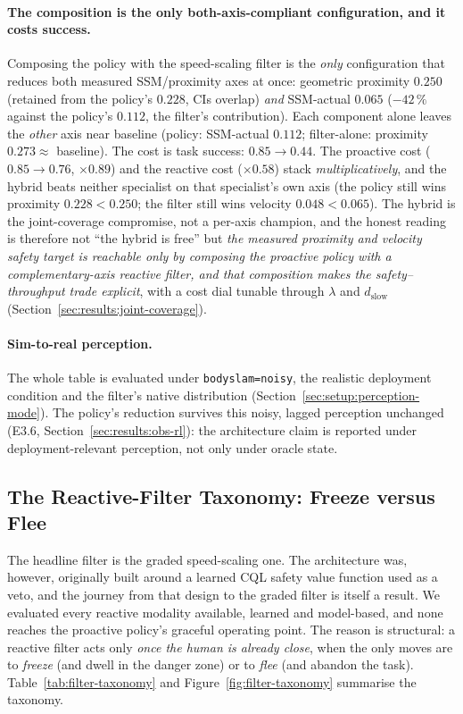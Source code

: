 \documentclass[11pt,a4paper]{report}
\newcommand{\ssm}{SSM}
\begin{document}
\paragraph{The composition is the only both-axis-compliant
configuration, and it costs success.}
Composing the policy with the speed-scaling filter is the \emph{only}
configuration that reduces both measured \ssm{}/proximity axes at once:
geometric
proximity $0.250$ (retained from the policy's $0.228$, CIs overlap)
\emph{and} \ssm{}-actual $0.065$ ($-42\,\%$ against the policy's
$0.112$, the filter's contribution). Each component alone leaves the
\emph{other} axis near baseline (policy: \ssm{}-actual $0.112$;
filter-alone: proximity $0.273 \approx$ baseline). The cost is task
success: $0.85 \rightarrow 0.44$. The proactive cost ($0.85 \to 0.76$,
$\times 0.89$) and the reactive cost ($\times 0.58$) stack
\emph{multiplicatively}, and the hybrid beats neither specialist on
that specialist's own axis (the policy still wins proximity
$0.228 < 0.250$; the filter still wins velocity $0.048 < 0.065$). The
hybrid is the joint-coverage compromise, not a per-axis champion, and
the honest reading is therefore not ``the hybrid is free'' but
\emph{the measured proximity and velocity safety target is reachable
only by composing the proactive policy with a complementary-axis
reactive filter, and that composition makes the safety--throughput
trade explicit}, with a cost dial tunable through
$\lambda$ and $d_{\mathrm{slow}}$
(Section~\ref{sec:results:joint-coverage}).

\paragraph{Sim-to-real perception.}
The whole table is evaluated under \texttt{bodyslam=noisy}, the
realistic deployment condition and the filter's native distribution
(Section~\ref{sec:setup:perception-mode}). The policy's reduction
survives this noisy, lagged perception unchanged (E3.6,
Section~\ref{sec:results:obs-rl}): the architecture claim is reported
under deployment-relevant perception, not only under oracle state.

\subsection{The Reactive-Filter Taxonomy: Freeze versus Flee}
\label{sec:results:reactive-taxonomy}

The headline filter is the graded speed-scaling one. The architecture
was, however, originally built around a learned \textsc{CQL} safety
value function used as a veto, and the journey from that design to the
graded filter is itself a result. We evaluated every reactive modality
available, learned and model-based, and none reaches the proactive
policy's graceful operating point. The reason is structural: a reactive
filter acts only \emph{once the human is already close}, when the only
moves are to \emph{freeze} (and dwell in the danger zone) or to
\emph{flee} (and abandon the task). Table~\ref{tab:filter-taxonomy} and
Figure~\ref{fig:filter-taxonomy} summarise the taxonomy.
\end{document}
